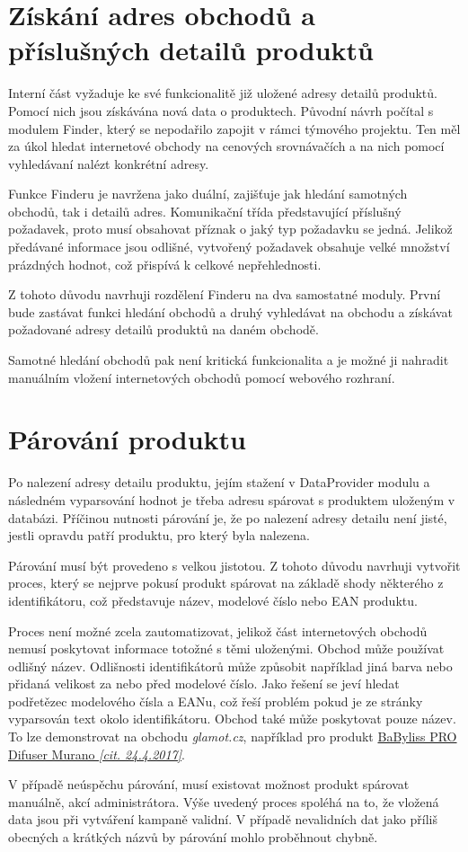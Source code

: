 \documentclass[thesis=B,czech]{FITthesis}[2012/06/26]
\begin{document}
\section{Získání adres obchodů a příslušných detailů produktů}
Interní část vyžaduje ke své funkcionalitě již uložené adresy detailů produktů. Pomocí nich jsou získávána nová data o produktech.
Původní návrh počítal s modulem Finder, který se nepodařilo zapojit v rámci týmového projektu. Ten 
měl za úkol hledat internetové obchody na cenových srovnávačích a na nich pomocí vyhledávaní nalézt konkrétní adresy.
\par
Funkce Finderu je navržena jako duální, zajišťuje jak hledání samotných obchodů, tak i detailů adres. Komunikační třída představující příslušný požadavek, proto musí obsahovat příznak o jaký typ požadavku se jedná. Jelikož předávané informace
jsou odlišné, vytvořený požadavek obsahuje velké množství prázdných hodnot, což přispívá k celkové nepřehlednosti.
\par
Z tohoto důvodu navrhuji rozdělení Finderu na dva samostatné moduly. První bude zastávat funkci hledání obchodů a druhý
vyhledávat na obchodu a získávat požadované adresy detailů produktů na daném obchodě.
\par
Samotné hledání obchodů pak není kritická funkcionalita a je možné ji nahradit manuálním vložení internetových obchodů pomocí webového rozhraní.


\section{Párování produktu}
Po nalezení adresy detailu produktu, jejím stažení v DataProvider modulu a následném vyparsování hodnot je třeba adresu spárovat s 
produktem uloženým v databázi. Příčinou nutnosti párování je, že po nalezení adresy detailu není jisté, jestli opravdu patří produktu, pro který 
byla nalezena. 
\par
Párování musí být provedeno s velkou jistotou. Z tohoto důvodu navrhuji vytvořit proces, který se nejprve pokusí produkt spárovat na základě shody některého z identifikátoru, což představuje název, modelové číslo nebo EAN produktu. 
\par
Proces není možné zcela zautomatizovat, jelikož část internetových obchodů nemusí poskytovat informace totožné s těmi uloženými.
Obchod může používat odlišný název. Odlišnosti identifikátorů může způsobit například jiná barva nebo přidaná velikost za nebo před modelové
číslo. Jako řešení se jeví hledat podřetězec modelového čísla a EANu, což řeší problém pokud je ze stránky vyparsován text okolo
identifikátoru. Obchod také může poskytovat pouze název. To lze demonstrovat na obchodu \textit{glamot.cz}, například
pro produkt 
\href{https://www.glamot.cz/p/19128/difuzer-k-vysouseci-babyliss-pro-difuser-murano}{BaByliss PRO Difuser Murano \textit{[cit. 24.4.2017]}}.
\par
V případě neúspěchu párování, musí existovat možnost produkt spárovat manuálně, akcí administrátora. 
Výše uvedený proces spoléhá na to, že vložená data jsou při vytváření kampaně validní. V případě nevalidních dat jako
příliš obecných a krátkých názvů by párování mohlo proběhnout chybně.
\end{document}
